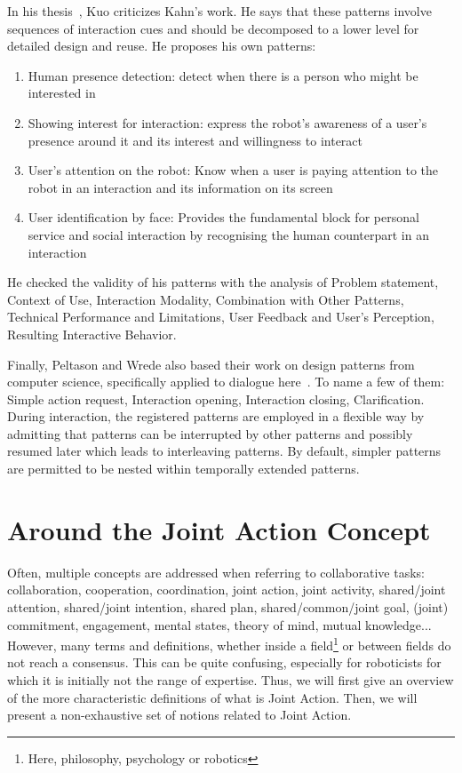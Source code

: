 \documentclass[a4paper,11pt,twoside]{StyleThese}
\begin{document}
In his thesis~\cite{kuo_2012_designing}, Kuo criticizes Kahn’s work. He says that these patterns involve sequences of interaction cues and should be decomposed to a lower level for detailed design and reuse. He proposes his own patterns:
\begin{enumerate}
	\item Human presence detection: detect when there is a person who might be interested in
	\item Showing interest for interaction: express the robot’s awareness of a user’s presence around it and its interest and willingness to interact
	\item User’s attention on the robot: Know when a user is paying attention to the robot in an interaction and its information on its screen
	\item User identification by face: Provides the fundamental block for personal service and social interaction by recognising the human counterpart in an interaction
\end{enumerate}
He checked the validity of his patterns with the analysis of Problem statement, Context of Use, Interaction Modality, Combination with Other Patterns, Technical Performance and Limitations, User Feedback and User’s Perception, Resulting Interactive Behavior.

Finally, Peltason and Wrede also based their work on design patterns from computer science, specifically applied to dialogue here~\cite{peltason_2010_pamini}. To name a few of them: Simple action request, Interaction opening, Interaction closing, Clarification. During interaction, the registered patterns are employed in a flexible way by admitting that patterns can be interrupted by other patterns and possibly resumed later which leads to interleaving patterns. By default, simpler patterns are permitted to be nested within temporally extended patterns.

\section{Around the Joint Action Concept}
Often, multiple concepts are addressed when referring to collaborative tasks: collaboration, cooperation, coordination, joint action, joint activity, shared/joint attention, shared/joint intention, shared plan, shared/common/joint goal, (joint) commitment, engagement, mental states, theory of mind, mutual knowledge... However, many terms and definitions, whether inside a field\footnote{Here, philosophy, psychology or robotics} or between fields do not reach a consensus. This can be quite confusing, especially for roboticists for which it is initially not the range of expertise. Thus, we will first give an overview of the more characteristic definitions of what is Joint Action. Then, we will present a non-exhaustive set of notions related to Joint Action. 
\end{document}
